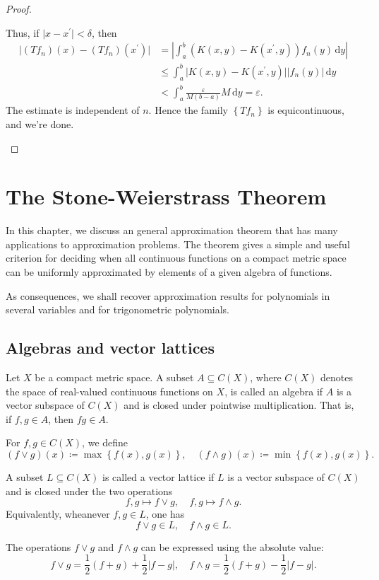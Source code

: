 \begin{proof}
\begin{itemize}
        Thus, if \(\vert x - x^{\prime}  \vert < \delta \), then 
        \begin{align*}
            \vert (T f_n)(x) - (T f_n)(x^{\prime} ) \vert &= \left\vert \int _a^b \left( K(x, y) - K(x^{\prime} , y) \right) f_n(y) \, \mathrm{d} y   \right\vert \\
            &\le \int _a^b \vert K(x, y) - K(x^{\prime} , y) \vert \vert f_n(y) \vert \, \mathrm{d} y \\
            &< \int _a^b \frac{\varepsilon}{M(b - a)} M \, \mathrm{d} y = \varepsilon.     
        \end{align*}      
        The estimate is independent of \(n\). Hence the family \(\left\{ T f_n \right\} \) is equicontinuous, and we're done.  
    \end{itemize}
\end{proof}

\chapter{The Stone-Weierstrass Theorem}
In this chapter, we discuss an general approximation theorem that has many applications to approximation problems. The theorem gives a simple and useful criterion for deciding when all continuous functions on a compact metric space can be uniformly approximated by elements of a given algebra of functions.

As consequences, we shall recover approximation results for polynomials in several variables and for trigonometric polynomials.

\section{Algebras and vector lattices}
\begin{definition}
    Let \(X\) be a compact metric space. A subset \(A \subseteq C(X)\), where \(C(X)\) denotes the space of real-valued continuous functions on \(X\), is called an algebra if \(A\) is a vector subspace of \(C(X)\) and is closed under pointwise multiplication. That is, if \(f, g \in A\), then \(fg \in A\).        
\end{definition}

For \(f, g \in C(X)\), we define 
\[
    (f \lor g)(x) \coloneqq \max \left\{ f(x), g(x) \right\}, \quad (f \land g)(x) \coloneqq \min \left\{ f(x), g(x) \right\}. 
\] 

\begin{definition}
    A subset \(L \subseteq C(X)\) is called a vector lattice if \(L\) is a vector subspace of \(C(X)\) and is closed under the two operations
    \[
        f, g \mapsto f \lor g, \quad f, g \mapsto f \land g.
    \]
    Equivalently, wheanever \(f, g \in L\), one has 
    \[
        f \lor g \in L, \quad f \land g \in L.
    \]   
\end{definition}

The operations \(f \lor g\) and \(f \land g\) can be expressed using the absolute value:
\[
    f \lor g = \frac{1}{2} (f + g) + \frac{1}{2} \vert f - g \vert, \quad f \land g = \frac{1}{2} (f + g) - \frac{1}{2} \vert f - g \vert.
\]